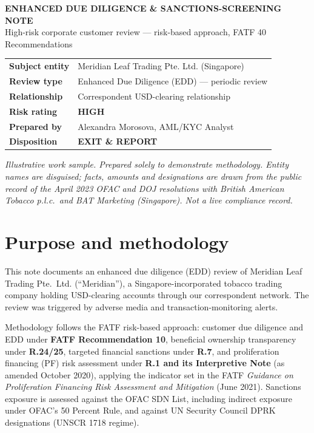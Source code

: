 \documentclass[10.5pt]{article}
\newcommand{\HeaderRow}[2]{\textbf{#1} & #2 \\}
\begin{document}
\thispagestyle{fancy}

{\large\bfseries\color{navy} ENHANCED DUE DILIGENCE \& SANCTIONS-SCREENING NOTE}\\[2pt]
{\small High-risk corporate customer review --- risk-based approach, FATF 40 Recommendations}

\vspace{6pt}
\noindent
\renewcommand{\arraystretch}{1.3}
\begin{tabular}{@{}L{4.2cm}L{11.5cm}@{}}
\HeaderRow{Subject entity}{Meridian Leaf Trading Pte. Ltd. (Singapore)}
\HeaderRow{Review type}{Enhanced Due Diligence (EDD) --- periodic review}
\HeaderRow{Relationship}{Correspondent USD-clearing relationship}
\HeaderRow{Risk rating}{\textbf{HIGH}}
\HeaderRow{Prepared by}{Alexandra Morosova, AML/KYC Analyst}
\HeaderRow{Disposition}{\textbf{EXIT \& REPORT}}
\end{tabular}

\vspace{4pt}
{\footnotesize\itshape Illustrative work sample. Prepared solely to demonstrate methodology. Entity names are disguised; facts, amounts and designations are drawn from the public record of the April 2023 OFAC and DOJ resolutions with British American Tobacco p.l.c.\ and BAT Marketing (Singapore). Not a live compliance record.}

\section{Purpose and methodology}
This note documents an enhanced due diligence (EDD) review of Meridian Leaf Trading Pte.\ Ltd. (``Meridian''), a Singapore-incorporated tobacco trading company holding USD-clearing accounts through our correspondent network. The review was triggered by adverse media and transaction-monitoring alerts.

Methodology follows the FATF risk-based approach: customer due diligence and EDD under \textbf{FATF Recommendation 10}, beneficial ownership transparency under \textbf{R.24/25}, targeted financial sanctions under \textbf{R.7}, and proliferation financing (PF) risk assessment under \textbf{R.1 and its Interpretive Note} (as amended October 2020), applying the indicator set in the FATF \textit{Guidance on Proliferation Financing Risk Assessment and Mitigation} (June 2021). Sanctions exposure is assessed against the OFAC SDN List, including indirect exposure under OFAC's 50 Percent Rule, and against UN Security Council DPRK designations (UNSCR 1718 regime).
\end{document}
